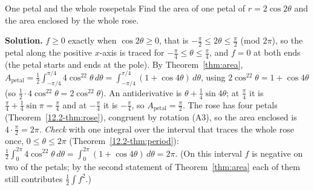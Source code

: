 \documentclass[11pt]{article}
\begin{document}
\begin{exmp}{One petal and the whole rose}{petals}
Find the area of one petal of $r=2\cos2\theta$ and the area enclosed by the whole rose.

\textbf{Solution.} $f\ge0$ exactly when $\cos2\theta\ge0$, that is $-\frac\pi2\le2\theta\le\frac\pi2$ (mod $2\pi$), so the petal along the positive $x$-axis is traced for $-\frac\pi4\le\theta\le\frac\pi4$, and $f=0$ at both ends (the petal starts and ends at the pole). By Theorem~\ref{thm:area}, $A_{\text{petal}}=\frac12\int_{-\pi/4}^{\pi/4}4\cos^22\theta\,d\theta=\int_{-\pi/4}^{\pi/4}(1+\cos4\theta)\,d\theta$, using $2\cos^22\theta=1+\cos4\theta$ (so $\frac12\cdot4\cos^22\theta=2\cos^22\theta$). An antiderivative is $\theta+\frac14\sin4\theta$; at $\frac\pi4$ it is $\frac\pi4+\frac14\sin\pi=\frac\pi4$ and at $-\frac\pi4$ it is $-\frac\pi4$, so $A_{\text{petal}}=\frac\pi2$.
The rose has four petals (Theorem~\ref{12.2-thm:rose}), congruent by rotation (A3), so the area enclosed is $4\cdot\frac\pi2=2\pi$. \emph{Check} with one integral over the interval that traces the whole rose once, $0\le\theta\le2\pi$ (Theorem~\ref{12.2-thm:period}): $\frac12\int_0^{2\pi}4\cos^22\theta\,d\theta=\int_0^{2\pi}(1+\cos4\theta)\,d\theta=2\pi$. (On this interval $f$ is negative on two of the petals; by the second statement of Theorem~\ref{thm:area} each of them still contributes $\frac12\int f^2$.)

\begin{center}
\end{center}
\end{exmp}
\end{document}
